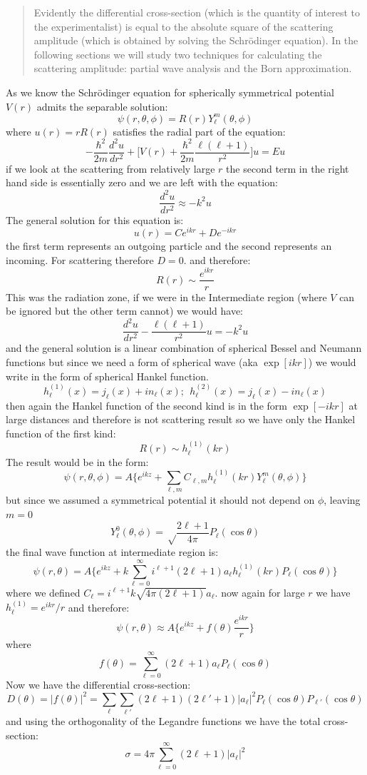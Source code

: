 \documentclass[10pt,a4paper]{report}
\begin{document}
\begin{}
\begin{quotation}
			Evidently the differential cross-section (which is the quantity of interest to the experimentalist) is equal to the absolute square of the scattering amplitude (which is obtained by solving the Schrödinger equation). In the following sections we will study two techniques for calculating the scattering amplitude: partial wave analysis and the Born approximation.
			\end{quotation}
			As we know the Schrödinger equation for spherically symmetrical potential $V(r)$ admits the separable solution:
			$$
			\psi(r,\theta,\phi) = R(r)Y_\ell^m(\theta,\phi)
			$$
			where $u(r) =rR(r) $ satisfies the radial part of the equation:
			$$
			-\frac{\hbar^2}{2m}\frac{d^2u}{dr^2}+\bigg[V(r) + \frac{\hbar^2}{2m}\frac{\ell(\ell+1)}{r^2}\bigg]u = Eu
			$$
			if we look at the scattering from relatively large $r$ the second term in the right hand side is essentially zero and we are left with the equation:
			$$
			\frac{d^2u}{dr^2}\approx - k^2 u
			$$
			The general solution for this equation is:
			$$
			u(r) = Ce^{ikr}+De^{-ikr}
			$$
			the first term represents an outgoing particle and the second represents an incoming. For scattering therefore $D=0$. and therefore:
			$$
			R(r)\sim \frac{e^{ikr}}{r}
			$$
			This was the radiation zone, if we were in the Intermediate region (where $V$ can be ignored but the other term cannot) we would have:
			$$
			\frac{d^2u}{dr^2}-\frac{\ell(\ell+1)}{r^2}u = -k^2u
			$$
			and the general solution is a linear combination of spherical Bessel and Neumann functions but since we need a form of spherical wave (aka $\exp[ikr]$) we would write in the form of spherical Hankel function.
			$$
			h_\ell^{(1)} (x) = j_\ell(x) + in_\ell(x); \ \ h_\ell^{(2)}(x) = j_\ell(x) - in_\ell(x)
			$$
			then again the Hankel function of the second kind is in the form $\exp[-ikr]$ at large distances and therefore is not scattering result so we have only the Hankel function of the first kind:
			$$
			R(r) \sim h_\ell^{(1)} (kr) 
			$$
			The result would be in the form:
			$$
			\psi(r,\theta,\phi) = A\bigg\{e^{ikz} + \sum_{\ell,m} C_{\ell,m} h_\ell^{(1)}(kr)Y_\ell^{m}(\theta,\phi)\bigg\}
			$$
			but since we assumed a symmetrical potential it should not depend on $\phi$, leaving $m=0$
			$$
			Y_\ell^0 (\theta,\phi) = \sqrt\frac{2\ell+1}{4\pi} P_\ell(\cos\theta)
			$$
			the final wave function at intermediate region is:
			$$
			\psi(r,\theta) = A\bigg\{e^{ikz} + k\sum_{\ell=0}^\infty i^{\ell +1}(2\ell+1)a_\ell h_\ell^{(1)}(kr)P_\ell(\cos\theta)\bigg\}
			$$
			where we defined $C_\ell = i^{\ell+1}k\sqrt{4\pi(2\ell+1)}a_\ell$. now again for large $r$ we have $h_\ell^{(1)} = e^{ikr}/r$ and therefore:
			$$
			\psi(r,\theta)\approx A\bigg\{e^{ikz} + f(\theta)\frac{e^{ikr}}{r}\bigg\}
			$$
			where
			$$
			f(\theta) = \sum_{\ell=0}^{\infty}(2\ell+1)a_\ell P_\ell(\cos\theta)
			$$
			Now we have the differential cross-section:
			$$
			D(\theta) = |f(\theta)|^2=\sum_\ell\sum_{\ell'}(2\ell+1)(2\ell'+1)|a_\ell|^2P_\ell(\cos\theta)P_{\ell'}(\cos\theta)
			$$
			and using the orthogonality of the Legandre functions we have the total cross-section:
			$$
			\sigma = 4\pi\sum_{\ell=0}^\infty(2\ell+1)|a_\ell|^2
			$$
			\newpage

\end{}
\end{document}
